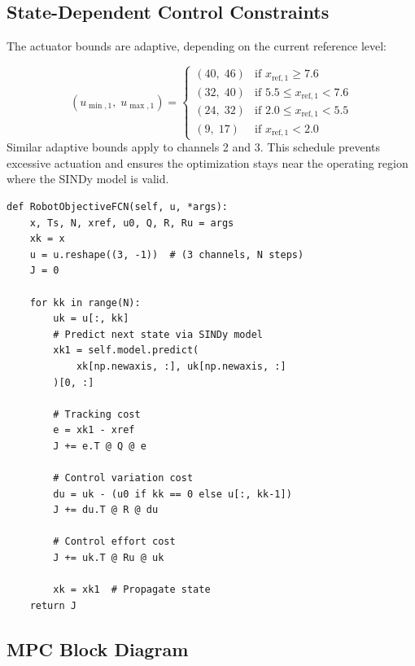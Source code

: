\documentclass[11pt,a4paper]{article}
\begin{document}
\subsection{State-Dependent Control Constraints}

The actuator bounds are adaptive, depending on the current reference level:

\begin{equationbox}
\begin{equation}
    (u_{\min,1},\; u_{\max,1}) = \begin{cases}
        (40,\; 46) & \text{if } x_{\text{ref},1} \geq 7.6 \\
        (32,\; 40) & \text{if } 5.5 \leq x_{\text{ref},1} < 7.6 \\
        (24,\; 32) & \text{if } 2.0 \leq x_{\text{ref},1} < 5.5 \\
        (9,\; 17)  & \text{if } x_{\text{ref},1} < 2.0
    \end{cases}
    \label{eq:bounds}
\end{equation}
Similar adaptive bounds apply to channels 2 and 3. This schedule
prevents excessive actuation and ensures the optimization stays near
the operating region where the SINDy model is valid.
\end{equationbox}

\begin{codebox}
\begin{lstlisting}
def RobotObjectiveFCN(self, u, *args):
    x, Ts, N, xref, u0, Q, R, Ru = args
    xk = x
    u = u.reshape((3, -1))  # (3 channels, N steps)
    J = 0

    for kk in range(N):
        uk = u[:, kk]
        # Predict next state via SINDy model
        xk1 = self.model.predict(
            xk[np.newaxis, :], uk[np.newaxis, :]
        )[0, :]

        # Tracking cost
        e = xk1 - xref
        J += e.T @ Q @ e

        # Control variation cost
        du = uk - (u0 if kk == 0 else u[:, kk-1])
        J += du.T @ R @ du

        # Control effort cost
        J += uk.T @ Ru @ uk

        xk = xk1  # Propagate state
    return J
\end{lstlisting}
\end{codebox}

\subsection{MPC Block Diagram}
\end{document}
